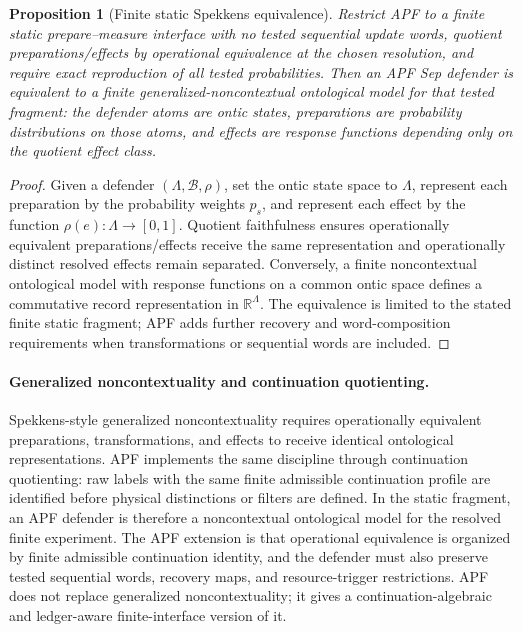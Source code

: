 \documentclass[11pt]{article}
\newtheorem{proposition}[theorem]{Proposition}
\newcommand{\R}{\mathbb R}
\begin{document}
\begin{proposition}[Finite static Spekkens equivalence]
\label{prop:finite-static-spekkens-equivalence}
Restrict APF to a finite static prepare--measure interface with no tested sequential update words, quotient preparations/effects by operational equivalence at the chosen resolution, and require exact reproduction of all tested probabilities.  Then an APF Sep defender is equivalent to a finite generalized-noncontextual ontological model for that tested fragment: the defender atoms are ontic states, preparations are probability distributions on those atoms, and effects are response functions depending only on the quotient effect class.
\end{proposition}
\begin{proof}
Given a defender \((\Lambda,\mathcal B,\rho)\), set the ontic state space to \(\Lambda\), represent each preparation by the probability weights \(p_s\), and represent each effect by the function \(\rho(e):\Lambda\to[0,1]\).  Quotient faithfulness ensures operationally equivalent preparations/effects receive the same representation and operationally distinct resolved effects remain separated.  Conversely, a finite noncontextual ontological model with response functions on a common ontic space defines a commutative record representation in \(\R^\Lambda\).  The equivalence is limited to the stated finite static fragment; APF adds further recovery and word-composition requirements when transformations or sequential words are included.
\end{proof}

\paragraph{Generalized noncontextuality and continuation quotienting.}
Spekkens-style generalized noncontextuality requires operationally
equivalent preparations, transformations, and effects to receive
identical ontological representations.  APF implements the same
discipline through continuation quotienting: raw labels with the
same finite admissible continuation profile are identified before
physical distinctions or filters are defined.  In the static
fragment, an APF defender is therefore a noncontextual ontological
model for the resolved finite experiment.  The APF extension is
that operational equivalence is organized by finite admissible
continuation identity, and the defender must also preserve tested
sequential words, recovery maps, and resource-trigger restrictions.
APF does not replace generalized noncontextuality; it gives a
continuation-algebraic and ledger-aware finite-interface version
of it.
\end{document}
